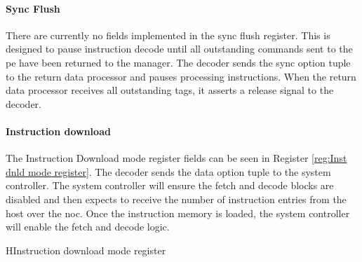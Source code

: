 \paragraph{Sync Flush}

There are currently no fields implemented in the sync flush register.
This is designed to pause instruction decode until all outstanding commands sent to the \ac{pe} have been returned to the manager.
The decoder sends the sync option tuple to the return data processor and pauses processing instructions.
When the return data processor receives all outstanding tags, it asserts a release signal to the decoder.


\paragraph{Instruction download}

The Instruction Download mode register fields can be seen in Register \ref{reg:Inst dnld mode register}.
The decoder sends the data option tuple to the system controller.
The system controller will ensure the fetch and decode blocks are disabled and then expects to receive the number of instruction entries from the host over the \ac{noc}.
Once the instruction memory is loaded, the system controller will enable the fetch and decode logic.
\begin{register}{H}{Instruction download mode register}{}%
  \label{reg:Inst dnld mode register}
  \vspace{-10pt}
\end{register}

